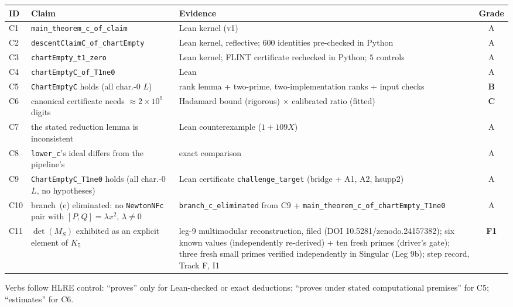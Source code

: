 \documentclass[a4paper,11pt]{article}
\newcommand{\filename}[1]{\texttt{\seqsplit{#1}}}
\theoremstyle{plain}
\theoremstyle{definition}
\theoremstyle{remark}
\begin{document}
{\small
\begin{center}
\begin{tabular}{llp{5.2cm}c}
\toprule
\textbf{ID} & \textbf{Claim} & \textbf{Evidence} & \textbf{Grade} \\
\midrule
C1 & \texttt{main\_theorem\_c\_of\_claim} & Lean kernel (v1) & A \\
C2 & \texttt{descentClaimC\_of\_chartEmpty} & Lean kernel, reflective; $600$ identities pre-checked in Python & A \\
C3 & \texttt{chartEmpty\_t1\_zero} & Lean kernel; FLINT certificate rechecked in Python; $5$ controls & A \\
C4 & \texttt{chartEmptyC\_of\_T1ne0} & Lean & A \\
C5 & \texttt{ChartEmptyC} holds (all char.-$0$ $L$) & rank lemma + two-prime, two-implementation ranks + input checks & \textbf{B} \\
C6 & canonical certificate needs $\approx2\times10^9$ digits & Hadamard bound (rigorous) $\times$ calibrated ratio (fitted) & \textbf{C} \\
C7 & the stated reduction lemma is inconsistent & Lean counterexample ($1+109X$) & A \\
C8 & \texttt{lower\_c}'s ideal differs from the pipeline's & exact comparison & A \\
C9 & \texttt{ChartEmptyC\_T1ne0} holds (all char.-$0$ $L$, no hypotheses) & Lean certificate \texttt{challenge\_target} (bridge + A1, A2, hsupp2) & A \\
C10 & branch~(c) eliminated: no \texttt{NewtonNFc} pair with $[P,Q]=\lambda x^2$, $\lambda\ne0$ & \texttt{branch\_c\_eliminated} from C9 + \texttt{main\_theorem\_c\_of\_chartEmpty\_T1ne0} & A \\
C11 & $\det(M_S)$ exhibited as an explicit element of $K_5$ & leg-9 multimodular reconstruction, filed \filename{gghv-dependency-closure/leg9/result.json} (DOI 10.5281/zenodo.24157382); six known values (independently re-derived) + ten fresh primes (driver's gate); three fresh small primes verified independently in Singular (Leg 9b); step record, Track F, I1 & \textbf{F1} \\
\bottomrule
\end{tabular}
\end{center}
}
\label{bc:tab:grades}

Verbs follow HLRE control: ``proves'' only for Lean-checked or exact deductions; ``proves under stated computational premises'' for C5; ``estimates'' for C6.
\end{document}
